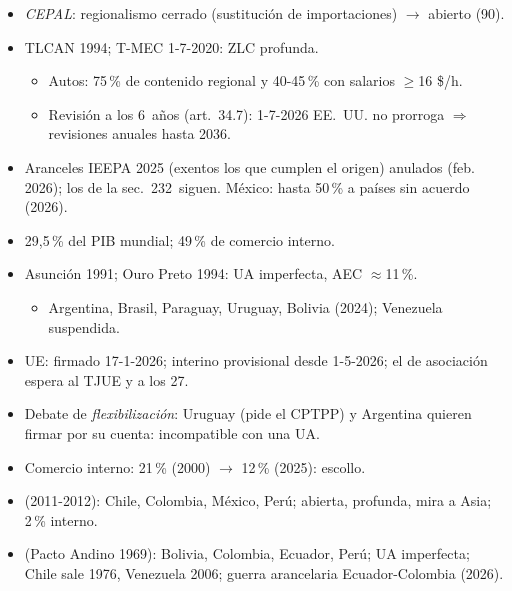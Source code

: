 \documentclass{article}
\begin{document}
\begin{columnas}
\begin{itemize}
\item \emph{CEPAL}: regionalismo cerrado (sustitución de importaciones) $\to$ abierto (90).
\end{itemize}
\begin{itemize}
\item TLCAN 1994; T-MEC 1-7-2020: ZLC profunda.
  \begin{itemize}
  \item Autos: 75\,\% de contenido regional y 40-45\,\% con salarios $\geq$16 \$/h.
  \item Revisión a los 6~años (art.~34.7): 1-7-2026 EE.~UU. no prorroga $\Rightarrow$ revisiones anuales hasta 2036.
  \end{itemize}
\item Aranceles IEEPA 2025 (exentos los que cumplen el origen) anulados (feb. 2026); los de la sec.~232~siguen. México: hasta 50\,\% a países sin acuerdo (2026).
\item 29,5\,\% del PIB mundial; 49\,\% de comercio interno.
\end{itemize}
\begin{itemize}
\item Asunción 1991; Ouro Preto 1994: UA imperfecta, AEC $\approx$11\,\%.
  \begin{itemize}
  \item Argentina, Brasil, Paraguay, Uruguay, Bolivia (2024); Venezuela suspendida.
  \end{itemize}
\item UE: firmado 17-1-2026; interino provisional desde 1-5-2026; el de asociación espera al TJUE y a los 27.
\item Debate de \emph{flexibilización}: Uruguay (pide el CPTPP) y Argentina quieren firmar por su cuenta: incompatible con una UA.
\item Comercio interno: 21\,\% (2000) $\to$ 12\,\% (2025): escollo.
\end{itemize}
\begin{itemize}
\item {} (2011-2012): Chile, Colombia, México, Perú; abierta, profunda, mira a Asia; 2\,\% interno.
\item {} (Pacto Andino 1969): Bolivia, Colombia, Ecuador, Perú; UA imperfecta; Chile sale 1976, Venezuela 2006; guerra arancelaria Ecuador-Colombia (2026).
\end{itemize}

\end{columnas}
\end{document}

